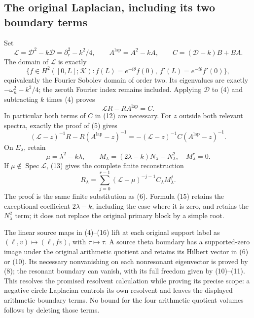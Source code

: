 \subsection{The original Laplacian, including its two boundary terms}
Set
\[
 \mathscr L=\mathscr D^2-k\mathscr D
 =\partial_r^2-k^2/4,
 \qquad A^{\mathrm{lap}}=A^2-kA,
 \qquad C=(\mathscr D-k)B+BA.
 \tag{12}
\]
The domain of \(\mathscr L\) is exactly
\[
 \{f\in H^2([0,L];\mathcal K):
 f(L)=e^{-i\theta}f(0),\ f'(L)=e^{-i\theta}f'(0)\},
\]
equivalently the Fourier Sobolev domain of order two.
Its eigenvalues are exactly \(-\omega_n^2-k^2/4\); the zeroth
Fourier index remains included. Applying \(\mathscr D\) to (4)
and subtracting \(k\) times (4) proves
\[
 \mathscr L R-RA^{\mathrm{lap}}=C.
 \tag{13}
\]
In particular both terms of \(C\) in (12) are necessary.
For \(z\) outside both relevant spectra, exactly the proof of (5)
gives
\[
 (\mathscr L-z)^{-1}R-R(A^{\mathrm{lap}}-z)^{-1}
 =-(\mathscr L-z)^{-1}C(A^{\mathrm{lap}}-z)^{-1}.
 \tag{14}
\]
On \(E_\lambda\), retain
\[
 \mu=\lambda^2-k\lambda,\qquad
 M_\lambda=(2\lambda-k)N_\lambda+N_\lambda^2,
 \quad M_\lambda^r=0.
 \tag{15}
\]
If \(\mu\notin\operatorname{Spec}\mathscr L\), (13) gives the
complete finite reconstruction
\[
 R_\lambda=\sum_{j=0}^{r-1}
       (\mathscr L-\mu)^{-j-1}C_\lambda M_\lambda^j.
 \tag{16}
\]
The proof is the same finite substitution as (6). Formula (15)
retains the exceptional coefficient \(2\lambda-k\), including
the case where it is zero, and retains the \(N_\lambda^2\) term;
it does not replace the original primary block by a simple root.

The linear source maps in (4)--(16) lift at each original support
label as \((\ell,v)\mapsto(\ell,fv)\), with
\(\tau\mapsto\tau\). A source theta boundary has a supported-zero
image under the original arithmetic quotient and retains its
Hilbert vector in (6) or (10). Its necessary nonvanishing on each
nonresonant eigenvector is proved by (8); the resonant boundary can
vanish, with its full freedom given by (10)--(11). This resolves the promised
resolvent calculation while proving its precise scope: a negative
circle Laplacian controls its own resolvent and leaves the displayed
arithmetic boundary terms. No bound for the four arithmetic quotient
volumes follows by deleting those terms.
\endgroup
